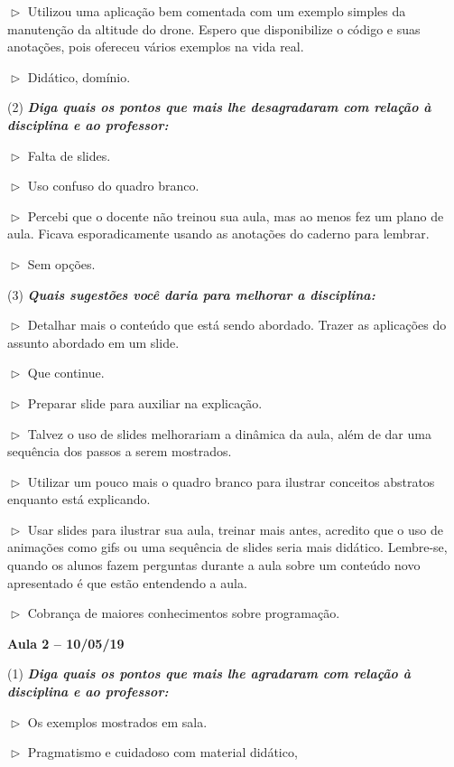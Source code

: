\documentclass[
	12pt,				%
	openright,			%
	oneside,			%
	a4paper,			%
	chapter=TITLE,		%
	section=TITLE,		%
	english,			%
	french,				%
	spanish,			%
	brazil				%
	]{abntex2}
\begin{document}
$\vartriangleright$ Utilizou uma aplicação bem comentada com um exemplo simples da manutenção da altitude do drone. Espero que disponibilize o código e suas anotações, pois ofereceu vários exemplos na vida real.

$\vartriangleright$ Didático, domínio.

(2) \textit{\textbf{Diga quais os pontos que mais lhe desagradaram com relação à disciplina e ao professor:}}

$\vartriangleright$ Falta de slides.

$\vartriangleright$ Uso confuso do quadro branco.

$\vartriangleright$ Percebi que o docente não treinou sua aula, mas ao menos fez um plano de aula. Ficava esporadicamente usando as anotações do caderno para lembrar.

$\vartriangleright$ Sem opções.

(3) \textit{\textbf{Quais sugestões você daria para melhorar a disciplina:}}

$\vartriangleright$ Detalhar mais o conteúdo que está sendo abordado. Trazer as aplicações do assunto abordado em um slide.

$\vartriangleright$ Que continue.

$\vartriangleright$ Preparar slide para auxiliar na explicação.

$\vartriangleright$ Talvez o uso de slides melhorariam a dinâmica da aula, além de dar uma sequência dos passos a serem mostrados.

$\vartriangleright$ Utilizar um pouco mais o quadro branco para ilustrar conceitos abstratos enquanto está explicando.

$\vartriangleright$ Usar slides para ilustrar sua aula, treinar mais antes, acredito que o uso de animações como gifs ou uma sequência de slides seria mais didático. Lembre-se, quando os alunos fazem perguntas durante a aula sobre um conteúdo novo apresentado é que estão entendendo a aula.

$\vartriangleright$ Cobrança de maiores conhecimentos sobre programação.


\vspace{1cm}

\textbf{Aula 2 -- 10/05/19}

(1) \textit{\textbf{Diga quais os pontos que mais lhe agradaram com relação à disciplina e ao professor:}}

$\vartriangleright$ Os exemplos mostrados em sala.

$\vartriangleright$ Pragmatismo e cuidadoso com material didático,
\end{document}
